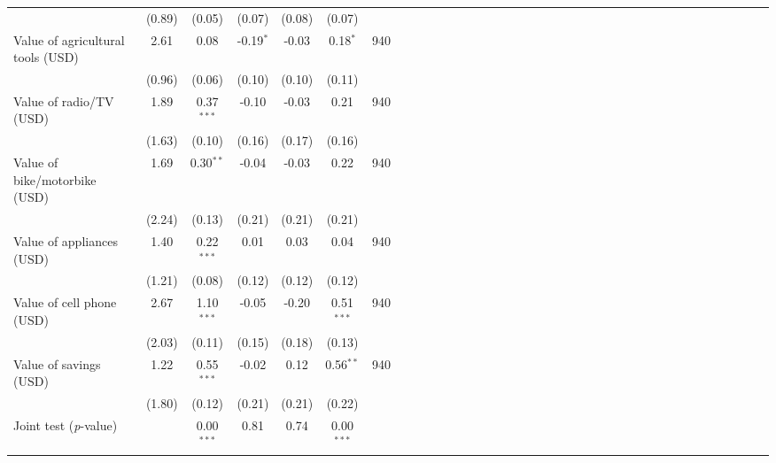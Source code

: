 {\begin{tabular}{l*{6}{SSSSSc}}
          &   (0.89)&   (0.05)&   (0.07)&   (0.08)&   (0.07)&         \\
\hspace{0.2cm}Value of agricultural tools (USD)&     2.61&     0.08&-0.19$^{*}$&    -0.03&0.18$^{*}$&      940\\
          &   (0.96)&   (0.06)&   (0.10)&   (0.10)&   (0.11)&         \\
\hspace{0.2cm}Value of radio/TV (USD)&     1.89&0.37$^{***}$&    -0.10&    -0.03&     0.21&      940\\
          &   (1.63)&   (0.10)&   (0.16)&   (0.17)&   (0.16)&         \\
\hspace{0.2cm}Value of bike/motorbike (USD)&     1.69&0.30$^{**}$&    -0.04&    -0.03&     0.22&      940\\
          &   (2.24)&   (0.13)&   (0.21)&   (0.21)&   (0.21)&         \\
\hspace{0.2cm}Value of appliances (USD)&     1.40&0.22$^{***}$&     0.01&     0.03&     0.04&      940\\
          &   (1.21)&   (0.08)&   (0.12)&   (0.12)&   (0.12)&         \\
\hspace{0.2cm}Value of cell phone (USD)&     2.67&1.10$^{***}$&    -0.05&    -0.20&0.51$^{***}$&      940\\
          &   (2.03)&   (0.11)&   (0.15)&   (0.18)&   (0.13)&         \\
Value of savings (USD)&     1.22&0.55$^{***}$&    -0.02&     0.12&0.56$^{**}$&      940\\
          &   (1.80)&   (0.12)&   (0.21)&   (0.21)&   (0.22)&         \\
\midrule Joint test (\emph{p}-value)&         &0.00$^{***}$&     0.81&     0.74&0.00$^{***}$&         \\
\bottomrule
\end{tabular}
}
